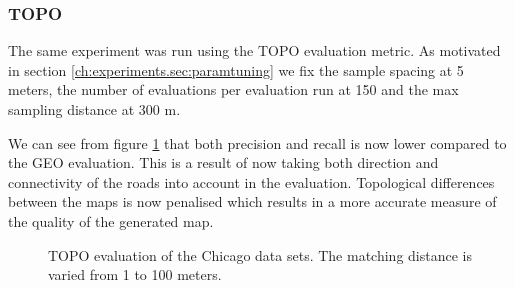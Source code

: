 \subsubsection{TOPO}
The same experiment was run using the TOPO evaluation metric. As motivated in section \ref{ch:experiments.sec:paramtuning} we fix the sample spacing at 5 meters, the number of evaluations per evaluation run at 150 and the max sampling distance at 300 m. 

We can see from figure \ref{fig:results/topo_match_dist_ch} that both precision and recall is now lower compared to the GEO evaluation. This is a result of now taking both direction and connectivity of the roads into account in the evaluation. Topological differences between the maps is now penalised which results in a more accurate measure of the quality of the generated map.

\begin{figure}[H]%
  \caption{TOPO evaluation of the Chicago data sets. The matching distance is varied from 1 to 100 meters.}%
 \label{fig:results/topo_match_dist_ch}
\end{figure}

